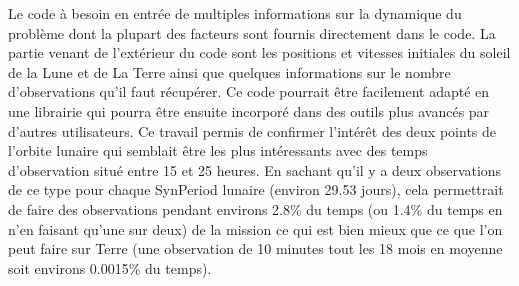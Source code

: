 \documentclass[11pt]{article} %
\begin{document}
		Le code à besoin en entrée de multiples informations sur la dynamique du problème dont la plupart des facteurs sont fournis directement dans le code. La partie venant de l'extérieur du code sont les positions et vitesses initiales du soleil de la Lune et de La Terre ainsi que quelques informations sur le nombre d'observations qu'il faut récupérer.
		Ce code pourrait être facilement adapté en une librairie qui pourra être ensuite incorporé dans des outils plus avancés par d'autres utilisateurs.
		Ce travail permis de confirmer l'intérêt des deux points de l'orbite lunaire qui semblait être les plus intéressants avec des temps d'observation situé entre 15 et 25 heures. En sachant qu'il y a deux observations de ce type pour chaque \gls{SynPeriod} lunaire (environ 29.53 jours), cela permettrait de faire des observations pendant environs 2.8\% du temps (ou 1.4\% du temps en n'en faisant qu'une sur deux) de la mission ce qui est bien mieux que ce que l'on peut faire sur Terre (une observation de 10 minutes tout les 18 mois en moyenne soit environs 0.0015\% du temps).
		
\end{document}
